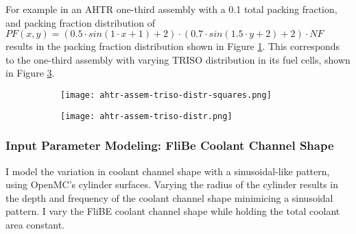 For example in an \gls{AHTR} one-third assembly with a 0.1 total packing fraction, and packing 
fraction distribution of $PF(x, y) = \left(0.5\cdot sin(1\cdot x + 1) + 2\right) \cdot 
\left(0.7\cdot sin(1.5\cdot y + 2) + 2\right) \cdot NF$ results in the packing fraction 
distribution shown in Figure \ref{fig:ahtr-assem-triso-distr-squares}.
This corresponds to the one-third assembly with varying TRISO distribution in its fuel 
cells, shown in Figure \ref{fig:ahtr-assem-triso-distr}. 
\begin{figure}[]
    \centering
    \begin{subfigure}{0.49\textwidth}
        \texttt{[image: ahtr-assem-triso-distr-squares.png]}
        \caption{}
        \label{fig:ahtr-assem-triso-distr-squares} 
    \end{subfigure}
    \begin{subfigure}{0.49\textwidth}
        \texttt{[image: ahtr-assem-triso-distr.png]}
        \raggedleft
        \caption{}
        \label{fig:ahtr-assem-triso-distr} 
    \end{subfigure}
    \caption{}
\end{figure}

\subsubsection{Input Parameter Modeling: FliBe Coolant Channel Shape}
I model the variation in coolant channel shape with a sinusoidal-like pattern, 
using OpenMC's cylinder surfaces.
Varying the radius of the cylinder results in the depth and frequency of the coolant 
channel shape minimicing a sinusoidal pattern.
I vary the FliBE coolant channel shape while holding the total coolant area constant. 

